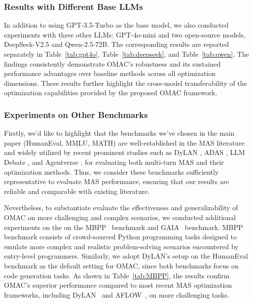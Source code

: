 \subsubsection{Results with Different Base LLMs}\label{sec:diff_llm}

In addition to using GPT-3.5-Turbo as the base model, we also conducted experiments with three other LLMs: GPT-4o-mini and   two open-source models, DeepSeek-V2.5 and Qwen-2.5-72B. The corresponding results are reported separately in Table~\ref{tab:gpt4o}, Table~\ref{tab:deepseek}, and Table~\ref{tab:qwen}. The findings consistently demonstrate OMAC’s robustness and its sustained performance advantages over baseline methods across all optimization dimensions. These results further highlight the cross-model transferability of the optimization capabilities provided by the proposed OMAC framework.









\subsubsection{Experiments on Other Benchmarks}\label{sec:mbpp}

Firstly, we'd like to highlight that the benchmarks we've chosen in the main paper (HumanEval, MMLU, MATH) are well-established in the MAS literature and widely utilized by recent prominent studies such as DyLAN \cite{dylan}, ADAS \cite{hu2024automated}, LLM Debate \cite{debate1-mit}, and Agentverse \cite{chen2023agentverse}, for evaluating both multi-turn MAS and their optimization methods. Thus, we consider these benchmarks sufficiently representative to evaluate MAS performance, ensuring that our results are reliable and comparable with existing literature.

Nevertheless, to substantiate evaluate the effectiveness and generalizability of OMAC on more challenging  and complex scenarios, we conducted additional experiments on the  on the MBPP~\cite{austin2021program} benchmark and GAIA~\cite{mialon2023gaia} benchmark. MBPP benchmark consists of crowd-sourced Python programming tasks designed to emulate more complex and realistic problem-solving scenarios encountered by entry-level programmers. Similarly, we adopt DyLAN’s setup on the HumanEval benchmark as the default setting for OMAC, since both benchmarks focus on code generation tasks. As shown in Table~\ref{tab:MBPP}, the results confirm OMAC’s superior performance compared to most recent MAS optimization frameworks, including DyLAN~\cite{dylan} and AFLOW~\cite{aflow}, on more challenging tasks.


